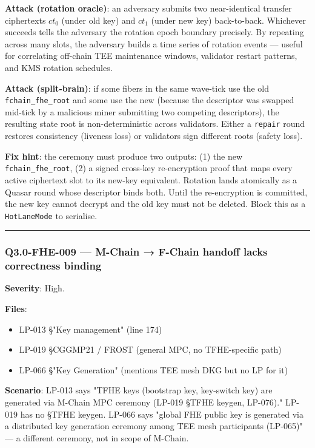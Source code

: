 \documentclass[
]{article}
\providecommand{\tightlist}{%
  \setlength{\itemsep}{0pt}\setlength{\parskip}{0pt}}
\begin{document}
\textbf{Attack (rotation oracle)}: an adversary submits two
near-identical transfer ciphertexts \(ct_0\) (under old key) and
\(ct_1\) (under new key) back-to-back. Whichever succeeds tells the
adversary the rotation epoch boundary precisely. By repeating across
many slots, the adversary builds a time series of rotation events ---
useful for correlating off-chain TEE maintenance windows, validator
restart patterns, and KMS rotation schedules.

\textbf{Attack (split-brain)}: if some fibers in the same wave-tick use
the old \texttt{fchain\_fhe\_root} and some use the new (because the
descriptor was swapped mid-tick by a malicious miner submitting two
competing descriptors), the resulting state root is non-deterministic
across validators. Either a \texttt{repair} round restores consistency
(liveness loss) or validators sign different roots (safety loss).

\textbf{Fix hint}: the ceremony must produce two outputs: (1) the new
\texttt{fchain\_fhe\_root}, (2) a signed cross-key re-encryption proof
that maps every active ciphertext slot to its new-key equivalent.
Rotation lands atomically as a Quasar round whose descriptor binds both.
Until the re-encryption is committed, the new key cannot decrypt and the
old key must not be deleted. Block this as a \texttt{HotLaneMode} to
serialise.

\begin{center}\rule{0.5\linewidth}{0.5pt}\end{center}

\subsubsection{Q3.0-FHE-009 --- M-Chain → F-Chain handoff lacks
correctness
binding}\label{q30-fhe-009--m-chain--f-chain-handoff-lacks-correctness-binding}

\textbf{Severity}: High.

\textbf{Files}:

\begin{itemize}
\tightlist
\item
  LP-013 §"Key management" (line 174)
\item
  LP-019 §CGGMP21 / FROST (general MPC, no TFHE-specific path)
\item
  LP-066 §"Key Generation" (mentions TEE mesh DKG but no LP for it)
\end{itemize}

\textbf{Scenario}: LP-013 says "TFHE keys (bootstrap key, key-switch
key) are generated via M-Chain MPC ceremony (LP-019 §TFHE keygen,
LP-076)." LP-019 has no §TFHE keygen. LP-066 says "global FHE public key
is generated via a distributed key generation ceremony among TEE mesh
participants (LP-065)" --- a different ceremony, not in scope of
M-Chain.
\end{document}
